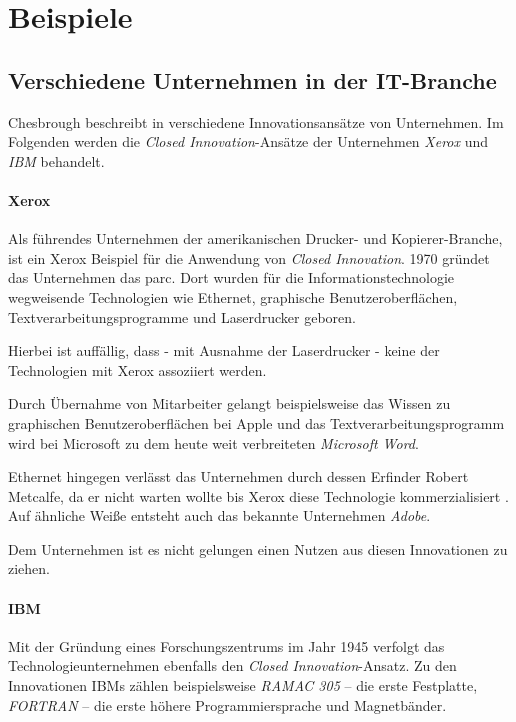 \section{Beispiele}\label{sec:beispiele}

\subsection{Verschiedene Unternehmen in der IT-Branche}\label{sec:beispiele-unternehmen}
Chesbrough beschreibt in \cite{chesbrough2003} verschiedene Innovationsansätze von Unternehmen.
Im Folgenden werden die \textit{Closed Innovation}-Ansätze der Unternehmen \textit{Xerox} und \textit{IBM} behandelt.

\paragraph{Xerox \cite[1\psqq]{chesbrough2003}}
Als führendes Unternehmen der amerikanischen Drucker- und Kopierer-Branche,
ist ein Xerox Beispiel für die Anwendung von \textit{Closed Innovation}.
1970 gründet das Unternehmen das \ac{parc}.
Dort wurden für die Informationstechnologie wegweisende Technologien wie
Ethernet, graphische Benutzeroberflächen, Textverarbeitungsprogramme und Laserdrucker geboren.

Hierbei ist auffällig, dass - mit Ausnahme der Laserdrucker - keine der Technologien mit Xerox
assoziiert werden.

Durch Übernahme von Mitarbeiter gelangt beispielsweise das Wissen zu graphischen Benutzeroberflächen bei Apple
und das Textverarbeitungsprogramm wird bei Microsoft zu dem heute weit verbreiteten \textit{Microsoft Word}.

Ethernet hingegen verlässt das Unternehmen durch dessen Erfinder Robert Metcalfe,
da er nicht warten wollte bis Xerox diese Technologie kommerzialisiert \cite[81]{chesbrough2003}.
Auf ähnliche Weiße entsteht auch das bekannte Unternehmen \textit{Adobe}.

Dem Unternehmen ist es nicht gelungen einen Nutzen aus diesen Innovationen zu ziehen.


\paragraph{IBM \cite[93\psqq]{chesbrough2003}}
Mit der Gründung eines Forschungszentrums im Jahr 1945 verfolgt das Technologieunternehmen ebenfalls den \textit{Closed Innovation}-Ansatz.
Zu den Innovationen IBMs zählen beispielsweise
\textit{RAMAC 305} -- die erste Festplatte,
\textit{FORTRAN} -- die erste höhere Programmiersprache und
Magnetbänder.

